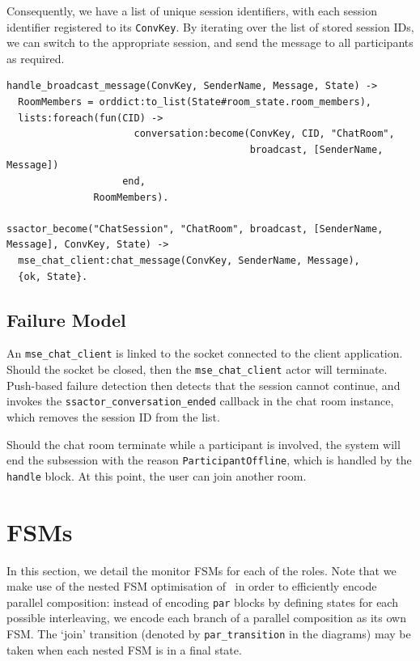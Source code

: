 \documentclass[a4paper]{article}
\begin{document}
Consequently, we have a list of unique session identifiers, with each session identifier registered to its \texttt{ConvKey}. By iterating over the list of stored session IDs, we can switch to the appropriate session, and send the message to all participants as required.
\begin{lstlisting}
handle_broadcast_message(ConvKey, SenderName, Message, State) ->
  RoomMembers = orddict:to_list(State#room_state.room_members),
  lists:foreach(fun(CID) ->
                      conversation:become(ConvKey, CID, "ChatRoom",
                                          broadcast, [SenderName, Message])
                    end,
               RoomMembers).
               
ssactor_become("ChatSession", "ChatRoom", broadcast, [SenderName, Message], ConvKey, State) ->
  mse_chat_client:chat_message(ConvKey, SenderName, Message),
  {ok, State}.
\end{lstlisting}

\subsection{Failure Model}
An \texttt{mse\_chat\_client} is linked to the socket connected to the client application. Should the socket be closed, then the \texttt{mse\_chat\_client} actor will terminate. Push-based failure detection then detects that the session cannot continue, and invokes the \texttt{ssactor\_conversation\_ended} callback in the chat room instance, which removes the session ID from the list.

Should the chat room terminate while a participant is involved, the system will end the subsession with the reason \texttt{ParticipantOffline}, which is handled by the \texttt{handle} block. At this point, the user can join another room.
\section{FSMs}
In this section, we detail the monitor FSMs for each of the roles. Note that we make use of the nested FSM optimisation of~\citet{hu:interruptible} in order to efficiently encode parallel composition: instead of encoding \texttt{par} blocks by defining states for each possible interleaving, we encode each branch of a parallel composition as its own FSM. The `join' transition (denoted by \texttt{par\_transition} in the diagrams) may be taken when each nested FSM is in a final state.
\end{document}
